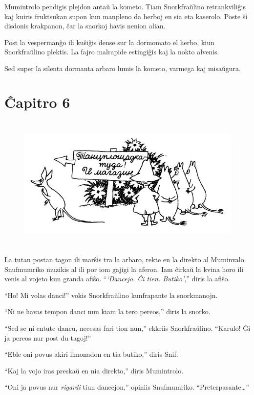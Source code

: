 Mumintrolo pendigis plejdon antaŭ la kometo. Tiam Snorkfraŭlino retrankviliĝis kaj kuiris fruktsukan supon kun manpleno da herboj en sia eta kaserolo. Poste ŝi disdonis krakpanon, ĉar la snorkoj havis nenion alian.

Post la vespermanĝo ili kuŝiĝis dense sur la dormomato el herbo, kiun Snorkfraŭlino plektis. La fajro malrapide estingiĝis kaj la nokto alvenis.

Sed super la silenta dormanta arbaro lumis la kometo, varmega kaj misaŭgura.

\chapter[Ĉapitro 6]{Ĉapitro 6}

\begin{figure}[htbp]
\centering
\includegraphics[width=400pt,height=191pt]{6-1.png}
\caption{}
\label{6-1}
\end{figure}

La tutan postan tagon ili marŝis tra la arbaro, rekte en la direkto al Muminvalo. Snufmumriko muzikis al ili por iom gajigi la aferon. Iam ĉirkaŭ la kvina horo ili venis al vojeto kun granda afiŝo. ``\emph{`Dancejo. Ĉi tien. Butiko'},'' diris la afiŝo.

``Ho! Mi volas danci!'' vokis Snorkfraŭlino kunfrapante la snorkmanojn.

``Ni ne havas tempon danci nun kiam la tero pereos,'' diris la snorko.

``Sed se ni entute dancu, necesas fari tion nun,'' ekkriis Snorkfraŭlino. ``Karulo! Ĝi ja pereos nur post du tagoj!''

``Eble oni povus akiri limonadon en tia butiko,'' diris Snif.

``Kaj la vojo iras preskaŭ en nia direkto,'' diris Mumintrolo.

``Oni ja povus nur \emph{rigardi} tiun dancejon,'' opiniis Snufmumriko. ``Preterpasante{\ldots}''

